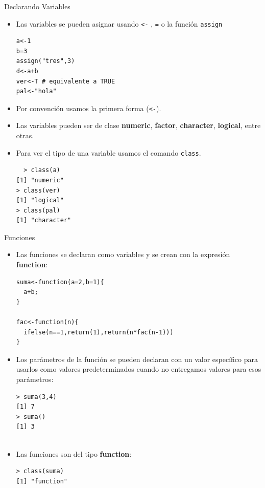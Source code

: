 \documentclass[handout]{beamer}
\begin{document}
\begin{frame}[fragile]{Declarando Variables}
\scriptsize{
\begin{itemize}
 \item Las variables se pueden asignar usando \verb+<-+ , \verb+=+ o la función \verb+assign+ 
 
  \begin{verbatim}
a<-1
b=3
assign("tres",3)
d<-a+b
ver<-T # equivalente a TRUE
pal<-"hola"
\end{verbatim}
 
 \item Por convención usamos la primera forma (\verb+<-+).
 
\item Las variables pueden ser de clase \textbf{numeric}, \textbf{factor}, \textbf{character}, \textbf{logical}, entre otras.
 
\item Para ver el tipo de una variable usamos el comando \verb+class+.
 \begin{verbatim}
  > class(a) 
[1] "numeric"
> class(ver)
[1] "logical"
> class(pal)
[1] "character"
 \end{verbatim}

 
 
\end{itemize}

}


\end{frame}


\begin{frame}[fragile]{Funciones}
\scriptsize{
\begin{itemize}
 \item Las funciones se declaran como variables y se crean con la expresión \textbf{function}:

\begin{verbatim}
suma<-function(a=2,b=1){
  a+b;
}

fac<-function(n){
  ifelse(n==1,return(1),return(n*fac(n-1)))    
}

\end{verbatim}

\item Los parámetros de la función se pueden declaran con un valor específico para usarlos como valores predeterminados cuando no entregamos valores para esos parámetros:
\begin{verbatim}
> suma(3,4)
[1] 7
> suma()
[1] 3
 
\end{verbatim}

\item Las funciones son del tipo \textbf{function}:
\begin{verbatim}
> class(suma)
[1] "function" 
\end{verbatim}


\end{itemize}


 
} 
\end{frame}
\end{document}
